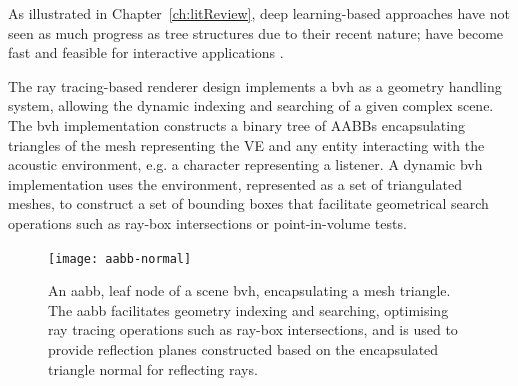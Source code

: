 As illustrated in Chapter~\ref{ch:litReview}, deep learning-based approaches have not seen as much progress as tree structures due to their recent nature;  have become fast and feasible for interactive applications \citep{kopta2012fast}.\par
The ray tracing-based renderer design implements a \acrfull{bvh} as a geometry handling system, allowing the dynamic indexing and searching of a given complex scene. The \acrshort{bvh} implementation constructs a binary tree of AABBs encapsulating triangles of the mesh representing the VE and any entity interacting with the acoustic environment, e.g. a character representing a listener. 
A dynamic \acrshort{bvh} implementation uses the environment, represented as a set of triangulated meshes, to construct a set of bounding boxes that facilitate geometrical search operations such as ray-box intersections or point-in-volume tests.\par
\begin{figure}[h]
    \centering
    \texttt{[image: aabb-normal]}
    \caption{An \acrfull{aabb}, leaf node of a scene \acrshort{bvh}, encapsulating a mesh triangle. The \acrshort{aabb} facilitates geometry indexing and searching, optimising ray tracing operations such as ray-box intersections, and is used to provide reflection planes constructed based on the encapsulated triangle normal for reflecting rays.}
    \label{fig:aabb-normal}
\end{figure}

